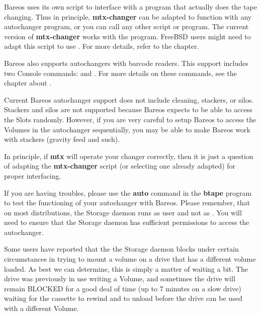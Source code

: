 Bareos uses its own  script to interface with a program
that actually does the tape changing.  Thus in principle, {\bf mtx-changer}
can be adapted to function with any autochanger program, or you can
call any other script or program. The current
version of {\bf mtx-changer} works with the  program.
FreeBSD users might need to adapt this script to use .
For more details, refer to the  chapter.

Bareos also supports autochangers with barcode
readers. This support includes two Console commands: 
and . For more details on these commands, see the chapter about .

Current Bareos autochanger support does not include cleaning, stackers, or
silos. Stackers and silos are not supported because Bareos expects to
be able to access the Slots randomly.
However, if you are very careful to setup Bareos to access the Volumes
in the autochanger sequentially, you may be able to make Bareos
work with stackers (gravity feed and such).

In principle, if {\bf mtx} will operate your changer correctly, then it is
just a question of adapting the {\bf mtx-changer} script (or selecting one
already adapted) for proper interfacing.



If you are having troubles, please use the {\bf auto} command in the {\bf
btape} program to test the functioning of your autochanger with Bareos.
Please remember, that on most distributions, the Storage daemon
runs as user  and not as .
You will need to ensure that the Storage daemon has sufficient
permissions to access the autochanger.

Some users have reported that the the Storage daemon blocks under certain
circumstances in trying to mount a volume on a drive that has a different
volume loaded.  As best we can determine, this is simply a matter of
waiting a bit.  The drive was previously in use writing a Volume, and
sometimes the drive will remain BLOCKED for a good deal of time (up to 7
minutes on a slow drive) waiting for the cassette to rewind and to unload
before the drive can be used with a different Volume.

